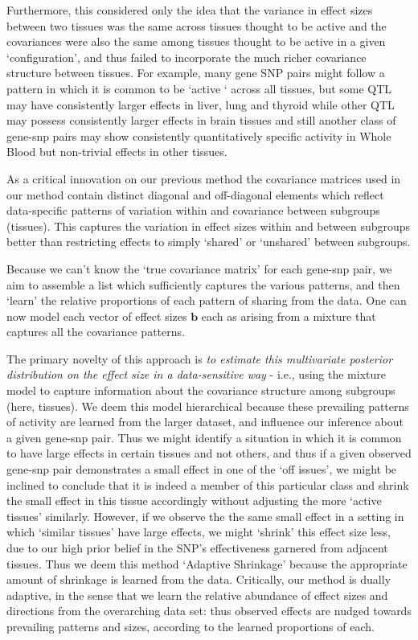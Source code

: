 Furthermore, this considered only the idea that the variance in effect sizes between two tissues was the same across tissues thought to be active and the covariances were also the same among tissues thought to be active in a given `configuration',  and thus failed to incorporate the much richer covariance structure between tissues. For example, many gene SNP pairs might follow a pattern in which it is common to be `active ` across all tissues, but some QTL may have consistently larger effects in liver, lung and thyroid while other QTL may possess consistently larger effects in brain tissues and still another class of gene-snp pairs may show consistently quantitatively specific activity in Whole Blood but non-trivial effects in other tissues. 

As a critical innovation on our previous method \cite{flutre_statistical_2013,wen_bayesian_2014} the covariance matrices used in our method contain distinct diagonal and off-diagonal elements which reflect data-specific patterns of variation within and covariance between subgroups (tissues). This captures the variation in effect sizes within and between subgroups better than restricting effects to simply `shared' or `unshared' between subgroups. 
 
Because we can't know the `true covariance matrix' for each gene-snp pair, we aim to assemble a list which sufficiently captures the various patterns, and then `learn' the relative proportions of each pattern of sharing from the data. One can now model each vector of effect sizes $\bm{b}$ each as arising from a mixture that captures all the covariance patterns.

The primary novelty of this approach is {\it to estimate this multivariate posterior distribution on the effect size in a data-sensitive way} - i.e., using the mixture model to capture information about the covariance structure among subgroups (here, tissues). We deem this model hierarchical because these prevailing patterns of activity are learned from the larger dataset, and influence our inference about a given gene-snp pair. Thus we might identify a situation in which it is common to have large effects in certain tissues and not others, and thus if a given observed gene-snp pair demonstrates a small effect in one of the `off issues', we might be inclined to conclude that it is indeed a member of this particular class and shrink the small effect in this tissue accordingly without adjusting the more `active tissues' similarly. However, if we observe the the same small effect in a setting in which `similar tissues' have large effects, we might `shrink' this effect size less, due to our high prior belief in the SNP's effectiveness garnered from adjacent tissues. Thus we deem this method `Adaptive Shrinkage' because the appropriate amount of shrinkage is learned from the data. Critically, our method is dually adaptive, in the sense that we learn the relative abundance of effect sizes and directions from the overarching data set: thus observed effects are nudged towards prevailing patterns and sizes, according to the learned proportions of each.

